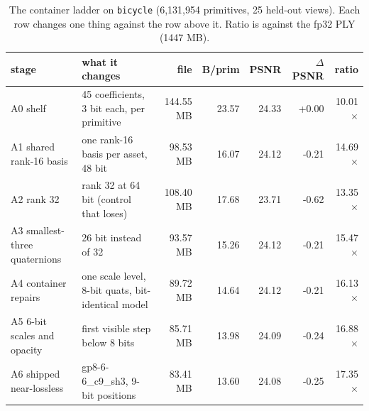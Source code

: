\begin{table}[t]
\centering
\small
\footnotesize
\setlength{\tabcolsep}{2.8pt}
\caption{The container ladder on \texttt{bicycle} (6{,}131{,}954 primitives, 25 held-out views). Each row changes one thing against the row above it. Ratio is against the fp32 PLY (1447 MB).}
\label{tab:container}
\begin{tabular}{lp{4.5cm}rrrrr}
\toprule
stage & what it changes & file & B/prim & PSNR & $\Delta$PSNR & ratio \\
\midrule
A0 shelf & 45 coefficients, 3 bit each, per primitive & 144.55 MB & 23.57 & 24.33 & +0.00 & 10.01$\times$ \\
A1 shared rank-16 basis & one rank-16 basis per asset, 48 bit & 98.53 MB & 16.07 & 24.12 & -0.21 & 14.69$\times$ \\
A2 rank 32 & rank 32 at 64 bit (control that loses) & 108.40 MB & 17.68 & 23.71 & -0.62 & 13.35$\times$ \\
A3 smallest-three quaternions & 26 bit instead of 32 & 93.57 MB & 15.26 & 24.12 & -0.21 & 15.47$\times$ \\
A4 container repairs & one scale level, 8-bit quats, bit-identical model & 89.72 MB & 14.64 & 24.12 & -0.21 & 16.13$\times$ \\
A5 6-bit scales and opacity & first visible step below 8 bits & 85.71 MB & 13.98 & 24.09 & -0.24 & 16.88$\times$ \\
A6 shipped near-lossless & gp8-6-6\_c9\_sh3, 9-bit positions & 83.41 MB & 13.60 & 24.08 & -0.25 & 17.35$\times$ \\
\bottomrule
\end{tabular}
\end{table}
